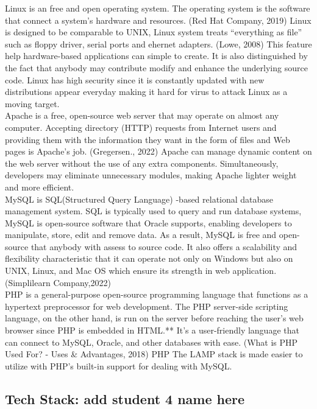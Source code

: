 \documentclass[a4paper, 11pt]{report}
\begin{document}
\noindent Linux is an free and open operating system. The operating system is the software that connect a system's hardware and resources. (Red Hat Company, 2019) Linux is designed to be comparable to UNIX,  Linux system treats “everything as file” such as floppy driver, serial ports and ehernet adapters.  (Lowe, 2008) This feature help hardware-based applications can simple to create. It is also distinguished by the fact that anybody may contribute modify and enhance the underlying source code. Linux has high security since it is constantly updated with new distributions appear everyday making it hard for virus to attack Linux as a moving target.\\

\noindent Apache is a free, open-source web server that may operate on almost any computer. Accepting directory (HTTP) requests from Internet users and providing them with the information they want in the form of files and Web pages is Apache's job. (Gregersen.,  2022) Apache can manage dynamic content on the web server without the use of any extra components. Simultaneously, developers may eliminate unnecessary modules, making Apache lighter weight and more efficient.\\

\noindent MySQL is SQL(Structured Query Language) -based relational database management system. SQL is typically used to query and run database systems, MySQL is open-source software that Oracle supports, enabling developers to manipulate, store, edit and remove data. As a result, MySQL is free and open-source that anybody with assess to source code. It also offers a scalability and flexibility characteristic that it can operate not only on Windows but also on UNIX, Linux, and Mac OS which ensure its strength in web application. (Simplilearn Company,2022) \\

\noindent PHP is a general-purpose open-source programming language that functions as a hypertext preprocessor for web development. The PHP server-side scripting language, on the other hand, is run on the server before reaching the user’s web browser since PHP is embedded in HTML.** It’s a user-friendly language that can connect to MySQL, Oracle, and other databases with ease. (What is PHP Used For? - Uses \& Advantages, 2018) PHP The LAMP stack is made easier to utilize with PHP’s built-in support for dealing with MySQL. \\



\subsection{Tech Stack: add student 4 name here}
\end{document}
